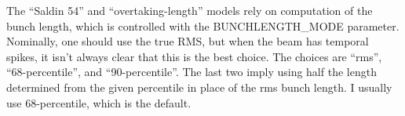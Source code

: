 The ``Saldin 54'' and ``overtaking-length'' models rely on computation
of the bunch length, which is controlled with the BUNCHLENGTH\_MODE
parameter.  Nominally, one should use the true RMS, but when the beam
has temporal spikes, it isn't always clear that this is the best
choice.  The choices are ``rms'', ``68-percentile'', and
``90-percentile''.  The last two imply using half the length
determined from the given percentile in place of the rms bunch length.
I usually use 68-percentile, which is the default.

